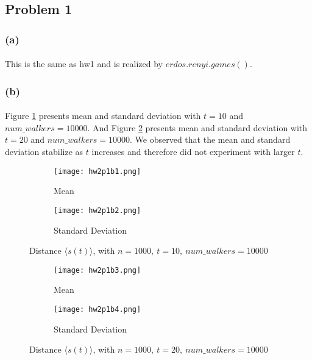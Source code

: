 \subsection*{Problem 1}
\subsubsection*{(a)}
\paragraph{}
This is the same as hw1 and is realized by $erdos.renyi.games()$.

\subsubsection*{(b)}
\paragraph{}
Figure \ref{fig:a1} presents mean and standard deviation with $t = 10$ and $num\_walkers = 10000$. And Figure \ref{fig:a2} presents mean and standard deviation with $t = 20$ and $num\_walkers = 10000$. We observed that the mean and standard deviation stabilize as $t$ increases and therefore did not experiment with larger $t$.

\begin{figure}[h]
	\centering
	\begin{subfigure}{.5\textwidth}
		\centering
		\texttt{[image: hw2p1b1.png]}
		\caption{Mean}	
	\end{subfigure}%
	\begin{subfigure}{.5\textwidth}
		\centering
		\texttt{[image: hw2p1b2.png]}
		\caption{Standard Deviation}
	\end{subfigure}
	\caption{Distance $\langle s(t)\rangle$, with $n = 1000,\ t = 10,\ num\_walkers = 10000$}
	\label{fig:a1}
\end{figure}

\begin{figure}[h!]
	\centering
	\begin{subfigure}{.5\textwidth}
		\centering
		\texttt{[image: hw2p1b3.png]}
		\caption{Mean}
	\end{subfigure}%
	\begin{subfigure}{.5\textwidth}
		\centering
		\texttt{[image: hw2p1b4.png]}
		\caption{Standard Deviation}
	\end{subfigure}
	\caption{Distance $\langle s(t)\rangle$, with $n = 1000,\ t = 20,\ num\_walkers = 10000$}
	\label{fig:a2}
\end{figure}

